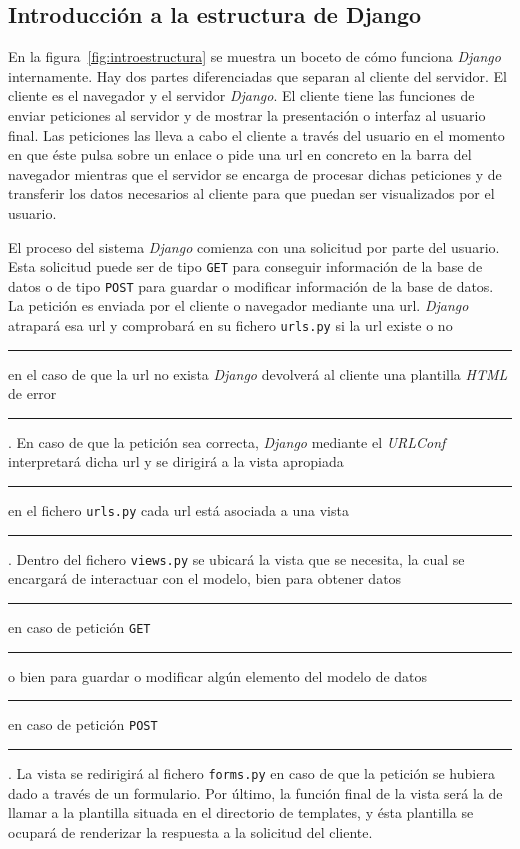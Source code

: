 \documentclass[a4paper, 12pt]{book}
\begin{document}
\subsection{Introducci\'on a la estructura de Django} 
\label{sec:introestructura}
En la figura~\ref{fig:introestructura} se muestra un boceto de c\'omo funciona \textit{Django} internamente. Hay dos partes diferenciadas que separan al
cliente del servidor. El cliente es el navegador y el servidor \textit{Django}. El cliente tiene las funciones de enviar peticiones al servidor y de 
mostrar la presentaci\'on o interfaz al usuario final. Las peticiones las lleva a cabo el cliente a trav\'es del usuario en el momento en que \'este 
pulsa sobre un enlace o pide una url en concreto en la barra del navegador mientras que el servidor se encarga de procesar dichas peticiones y de 
transferir los datos necesarios al cliente para que puedan ser visualizados por el usuario.

El proceso del sistema \textit{Django} comienza con una solicitud por parte del usuario. Esta solicitud puede ser de tipo \texttt{GET} para conseguir 
informaci\'on de la base de datos o de tipo \texttt{POST} para guardar o modificar informaci\'on de la base de datos. La petici\'on es enviada por el 
cliente o navegador mediante una url. \textit{Django} atrapar\'a esa url y comprobar\'a en su fichero \texttt{urls.py} si la url existe o no 
\rule[1mm]{4mm}{0.1mm}en el caso de que la url no exista \textit{Django} devolver\'a al cliente una plantilla \textit{HTML} de error\rule[1mm]{4mm}{0.1mm}.
En caso de que la petici\'on sea correcta, \textit{Django} mediante el \textit{URLConf} interpretar\'a dicha url y se dirigir\'a a la vista apropiada 
\rule[1mm]{4mm}{0.1mm}en el fichero \texttt{urls.py} cada url est\'a asociada a una vista\rule[1mm]{4mm}{0.1mm}. Dentro del fichero \texttt{views.py} se
ubicar\'a la vista que se necesita, la cual se encargar\'a de interactuar con el modelo, bien para obtener datos \rule[1mm]{4mm}{0.1mm}en caso de 
petici\'on \texttt{GET}\rule[1mm]{4mm}{0.1mm} o bien para guardar o modificar alg\'un elemento del modelo de datos \rule[1mm]{4mm}{0.1mm}en caso de 
petici\'on \texttt{POST}\rule[1mm]{4mm}{0.1mm}. La vista se redirigir\'a al fichero \texttt{forms.py} en caso de que la petici\'on se hubiera dado a trav\'es
de un formulario. Por \'ultimo, la funci\'on final de la vista ser\'a la de llamar a la plantilla situada en el directorio de templates, y \'esta plantilla
se ocupar\'a de renderizar la respuesta a la solicitud del cliente.
\end{document}
